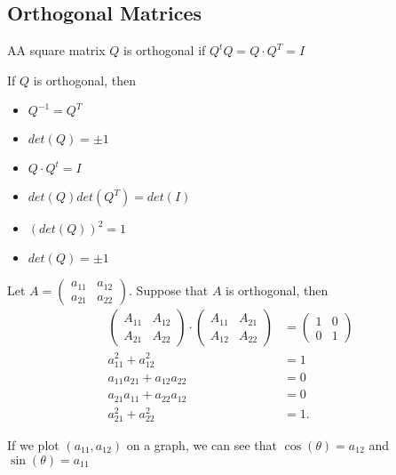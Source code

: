 \subsection{}
\subsection{Orthogonal Matrices}

  \begin{definition}
    AA square matrix $Q$ is orthogonal if $Q^{t}Q=Q\cdot Q^{T}=I$
  \end{definition}

  If $Q$ is orthogonal, then
  \begin{itemize}
    \item $Q^{-1}=Q^{T}$
    \item $det(Q)=\pm 1$
    \item $Q\cdot Q^{t}=I$
    \item $det(Q)det(Q^{T})=det(I)$
    \item $(det(Q))^2=1$
    \item $det(Q)=\pm 1$
  \end{itemize}

  Let $A=\begin{pmatrix} a_{11}&a_{12}\\a_{21}&a_{22} \end{pmatrix} $. Suppose that $A$ is orthogonal, then 
  \begin{align*}
    \begin{pmatrix} A_{11}&A_{12}\\A_{21}&A_{22} \end{pmatrix}\cdot\begin{pmatrix} A_{11}&A_{21}\\A_{12}&A_{22} \end{pmatrix} &=\begin{pmatrix} 1&0\\0&1 \end{pmatrix} \\
    a_{11}^2+a_{12}^2&=1\\
    a_{11}a_{21}+a_{12}a_{22}&=0\\
    a_{21}a_{11}+a_{22}a_{12}&=0\\
    a_{21}^2+a_{22}^2&=1
  .\end{align*}
  
  If we plot $(a_{11},a_{12})$ on a graph, we can see that $\cos\left( \theta \right) =a_{12}$ and $\sin(\theta)=a_{11} $

